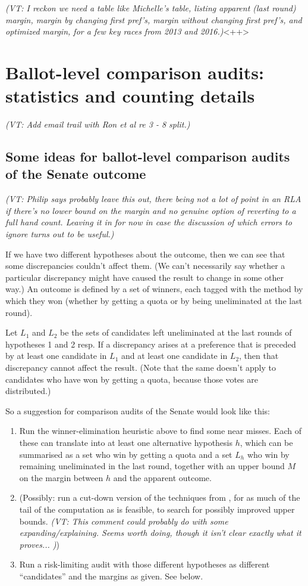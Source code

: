 \documentclass[10pt,a4paper]{article}
\newcommand{\VTNote}[1]{{\it(VT: #1)}}
\begin{document}
\VTNote{I reckon we need a table like Michelle's table, listing apparent (last round) margin, margin by changing first pref's, margin without changing first pref's, and optimized margin, for a few key races from 2013 and 2016.}<++>



\section{Ballot-level comparison audits: statistics and counting details} \label{sec:comparisonAudits}
\VTNote{Add email trail with Ron et al re 3 - 8 split.}

\subsection{Some ideas for ballot-level comparison audits of the Senate outcome}
\VTNote{Philip says probably leave this out, there being not a lot of point in an RLA if there's no lower bound on the margin and no genuine option of reverting to a full hand count.  Leaving it in for now in case the discussion of which errors to ignore turns out to be useful.}

If we have two different hypotheses about the outcome, then we can see that some discrepancies couldn't affect them.  (We can't necessarily say whether a particular discrepancy might have caused the result to change in some other way.)  An outcome is defined by a set of winners, each tagged with the method by which they won (whether by getting a quota or by being uneliminated at the last round).

Let $L_1$ and $L_2$ be the sets of candidates left uneliminated at the last rounds of hypotheses 1 and 2 resp.  If a discrepancy arises at a preference that is preceded by at least one candidate in $L_1$ and at least one candidate in $L_2$, then that discrepancy cannot affect the result.  (Note that the same doesn't apply to candidates who have won by getting a quota, because those votes are distributed.)

So a suggestion for comparison audits of the Senate would look like this:
\begin{enumerate}
\item Run the winner-elimination heuristic above to find some near misses.  Each of these can translate into at least one alternative hypothesis $h$, which can be summarised as a set who win by getting a quota and a set $L_h$ who win by remaining uneliminated in the last round, together with an upper bound $M$ on the margin between $h$ and the apparent outcome.
\item (Possibly: run a cut-down version of the techniques from \cite{blom2015efficient}, for as much of the tail of the computation as is feasible, to search for possibly improved upper bounds.  \VTNote{This comment could probably do with some expanding/explaining.  Seems worth doing, though it isn't clear exactly what it proves...  })
\item Run a risk-limiting audit with those different hypotheses as different ``candidates'' and the margins as given.  See below. 
\end{enumerate}
\end{document}
